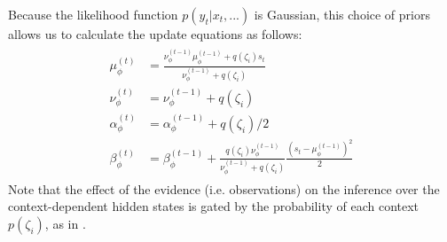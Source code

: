 \documentclass[a4paper,doc,floatsintext,natbib]{apa6}%
\begin{document}
Because the likelihood function $p(y_t | x_t, ...)$ is Gaussian, this choice of priors allows us to calculate the update equations as follows:
\begin{align}
  \begin{split}
  \mu_\phi^{(t)} &= \frac{\nu_\phi^{(t-1)} \mu_\phi^{(t-1)} + q(\zeta_i)s_t}{\nu_\phi^{(t-1)} + q(\zeta_i)} \\
  \nu_\phi^{(t)} &= \nu_\phi^{(t-1)} + q(\zeta_i) \\
  \alpha_\phi^{(t)} &= \alpha_\phi^{(t-1)} + q(\zeta_i) / 2 \\
  \beta_\phi^{(t)} &= \beta_\phi^{(t-1)} + \frac{q(\zeta_i)\nu_\phi^{(t-1)}}{\nu_\phi^{(t-1)} +
    q(\zeta_i)}\frac{\left(s_t - \mu_\phi^{(t-1)}\right)^2}{2}  \label{eqn:update-full}
  \end{split}
\end{align}
Note that the effect of the evidence (i.e. observations) on the inference over the context-dependent hidden states is gated by the probability of each context $p(\zeta_i)$, as in \cite[][supplementary materials]{Heald_Contextual_2021}.
\end{document}
